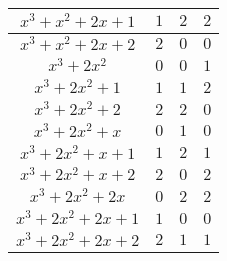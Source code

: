 \documentclass{article}
\begin{document}
\begin{table}[h]
\begin{tabular}{|c|c|c|c|}
        \hline 
        $x^3+x^2+2x+1$ & $1$ & $2$ & $2$ \\
        \hline 
        $x^3+x^2+2x+2$ & $2$ & $0$ & $0$ \\
        \hline 
        $x^3+2x^2$ & $0$ & $0$ & $1$ \\
        \hline 
        $x^3+2x^2+1$ & $1$ & $1$ & $2$ \\
        \hline 
        $x^3+2x^2+2$ & $2$ & $2$ & $0$ \\
        \hline 
        $x^3+2x^2+x$ & $0$ & $1$ & $0$ \\
        \hline 
        $x^3+2x^2+x+1$ & $1$ &$2$ & $1$ \\
        \hline 
        $x^3+2x^2+x+2$ & $2$ & $0$ & $2$ \\
        \hline 
        $x^3+2x^2+2x$ & $0$ & $2$ & $2$ \\
        \hline 
        $x^3+2x^2+2x+1$ & $1$ & $0$ & $0$ \\
        \hline 
        $x^3+2x^2+2x+2$ & $2$ & $1$ & $1$ \\
        \hline 
    \end{tabular}
\end{table}
\newpage 
\end{document}
